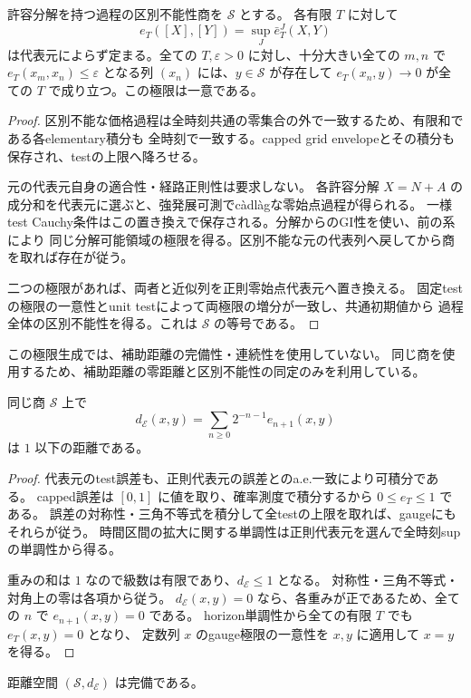 \begin{proposition}
許容分解を持つ過程の区別不能性商を $\mathcal S$ とする。
各有限 $T$ に対して
\[
 e_T([X],[Y])=\sup_J \bar e_T^J(X,Y)
\]
は代表元によらず定まる。全ての $T,\varepsilon>0$ に対し、十分大きい全ての $m,n$ で
$e_T(x_m,x_n)\le\varepsilon$ となる列 $(x_n)$ には、$y\in\mathcal S$ が存在して
$e_T(x_n,y)\to0$ が全ての $T$ で成り立つ。この極限は一意である。
\end{proposition}
\begin{proof}
区別不能な価格過程は全時刻共通の零集合の外で一致するため、有限和である各elementary積分も
全時刻で一致する。capped grid envelopeとその積分も保存され、testの上限へ降ろせる。

元の代表元自身の適合性・経路正則性は要求しない。
各許容分解 $X=N+A$ の成分和を代表元に選ぶと、強発展可測でcàdlàgな零始点過程が得られる。
一様test Cauchy条件はこの置き換えで保存される。分解からのGI性を使い、前の系により
同じ分解可能領域の極限を得る。区別不能な元の代表列へ戻してから商を取れば存在が従う。

二つの極限があれば、両者と近似列を正則零始点代表元へ置き換える。
固定testの極限の一意性とunit testによって両極限の増分が一致し、共通初期値から
過程全体の区別不能性を得る。これは $\mathcal S$ の等号である。
\end{proof}
この極限生成では、補助距離の完備性・連続性を使用していない。
同じ商を使用するため、補助距離の零距離と区別不能性の同定のみを利用している。
\begin{proposition}[時間重み付きelementary距離]
同じ商 $\mathcal S$ 上で
\[
 d_{\mathcal E}(x,y)=\sum_{n\ge0}2^{-n-1}e_{n+1}(x,y)
\]
は $1$ 以下の距離である。
\end{proposition}
\begin{proof}
代表元のtest誤差も、正則代表元の誤差とのa.e.一致により可積分である。
capped誤差は $[0,1]$ に値を取り、確率測度で積分するから $0\le e_T\le1$ である。
誤差の対称性・三角不等式を積分して全testの上限を取れば、gaugeにもそれらが従う。
時間区間の拡大に関する単調性は正則代表元を選んで全時刻supの単調性から得る。

重みの和は $1$ なので級数は有限であり、$d_{\mathcal E}\le1$ となる。
対称性・三角不等式・対角上の零は各項から従う。
$d_{\mathcal E}(x,y)=0$ なら、各重みが正であるため、全ての $n$ で $e_{n+1}(x,y)=0$ である。
horizon単調性から全ての有限 $T$ でも $e_T(x,y)=0$ となり、
定数列 $x$ のgauge極限の一意性を $x,y$ に適用して $x=y$ を得る。
\end{proof}
\begin{proposition}[elementary距離の独立完備性]
距離空間 $(\mathcal S,d_{\mathcal E})$ は完備である。
\end{proposition}
